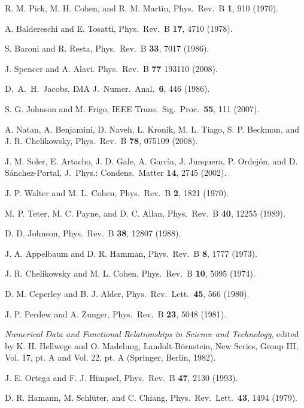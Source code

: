 \documentclass[twocolumn,prb,showpacs,superscriptaddress]{revtex4}
\begin{document}
\begin{thebibliography}{99}
R. M. Pick, M. H. Cohen, and R. M. Martin,
Phys.\ Rev.\ B {\bf 1}, 910 (1970). 

A. Baldereschi and E. Tosatti,
Phys.\ Rev.\ B {\bf 17}, 4710 (1978).

S. Baroni and R. Resta,
Phys.\ Rev.\ B {\bf 33}, 7017 (1986).

J. Spencer and A. Alavi.
Phys.\ Rev.\ B {\bf 77} 193110 (2008).

D.\ A.\ H.\ Jacobs,
IMA J.\ Numer.\ Anal.\ {\bf 6}, 446 (1986).

S. G. Johnson and M. Frigo,
IEEE Trans.\ Sig.\ Proc.\ {\bf 55}, 111 (2007).

A. Natan, A. Benjamini, D. Naveh, L. Kronik, M. L. Tiago, S. P. Beckman, and J. R. Chelikowsky,
Phys.\ Rev.\ B {\bf 78}, 075109 (2008).

J. M. Soler, E. Artacho, J. D. Gale, A. Garc\`ia, J. Junquera, P. Ordej\'on, and D. S\'anchez-Portal,
J.\ Phys.: Condens.\ Matter {\bf 14}, 2745 (2002).

J. P. Walter and M. L. Cohen,
Phys.\ Rev.\ B {\bf 2}, 1821 (1970).

M. P. Teter, M. C. Payne, and D. C. Allan,
Phys.\ Rev.\ B {\bf 40}, 12255 (1989).

D. D. Johnson, 
Phys.\ Rev.\ B {\bf 38}, 12807 (1988).

J. A. Appelbaum and D. R. Hamman, 
Phys.\ Rev.\ B {\bf 8}, 1777 (1973).

J. R. Chelikowsky and M. L. Cohen,
Phys.\ Rev.\ B {\bf 10}, 5095 (1974).

D. M. Ceperley and B. J. Alder,
Phys.\ Rev.\ Lett.\ {\bf 45}, 566 (1980).

J. P. Perdew and A. Zunger,
Phys.\ Rev.\ B {\bf 23}, 5048 (1981).

{\it Numerical Data and Functional Relationships in Science and Technology}, 
edited by K. H. Hellwege and O. Madelung, Landolt-B\"ornstein, 
New Series, Group III, Vol. 17, pt. A and Vol. 22, pt. A (Springer, Berlin, 1982).

J. E. Ortega and F. J. Himpsel, 
Phys.\ Rev.\ B {\bf 47}, 2130 (1993).

D. R. Hamann, M. Schl\"uter, and C. Chiang,
Phys.\ Rev.\ Lett.\ {\bf 43}, 1494 (1979).


\end{thebibliography}
\end{document}
